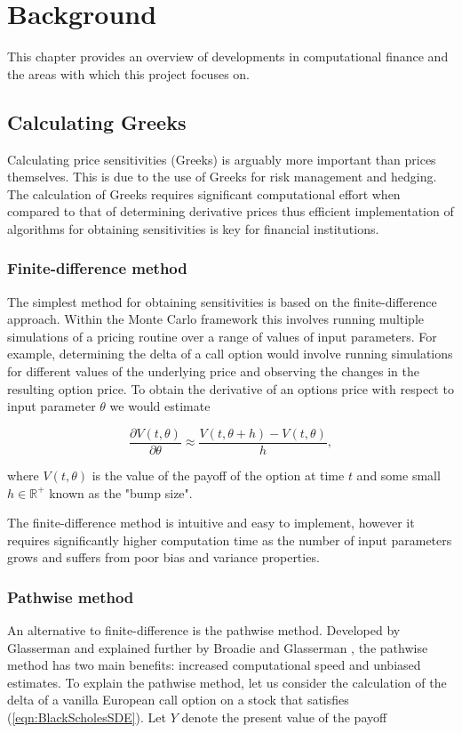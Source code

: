 \chapter{Background} \label{cha:Background}
This chapter provides an overview of developments in computational finance and the areas with which this project focuses on.

\section{Calculating Greeks}
Calculating price sensitivities (Greeks) is arguably more important than prices themselves. This is due to the use of Greeks for risk management and hedging. The calculation of Greeks requires significant computational effort when compared to that of determining derivative prices thus efficient implementation of algorithms for obtaining sensitivities is key for financial institutions.

\subsection{Finite-difference method}
The simplest method for obtaining sensitivities is based on the finite-difference approach. Within the Monte Carlo framework this involves running multiple simulations of a pricing routine over a range of values of input parameters. For example, determining the delta of a call option would involve running simulations for different values of the underlying price and observing the changes in the resulting option price. To obtain the derivative of an options price with respect to input parameter $\theta$ we would estimate 

\begin{equation*}
    \frac{\partial V(t, \theta)}{\partial \theta} \approx \frac{V(t, \theta + h) - V(t, \theta)}{h},
\end{equation*}

where $V(t, \theta)$ is the value of the payoff of the option at time $t$ and some small $h \in \mathbb{R}^+$ known as the "bump size".

The finite-difference method is intuitive and easy to implement, however it requires significantly higher computation time as the number of input parameters grows and suffers from poor bias and variance properties.

\subsection{Pathwise method} \label{sec:PathwiseMethod}
An alternative to finite-difference is the pathwise method. Developed by Glasserman \cite{glasserman1991gradient} and explained further by Broadie and Glasserman \cite{broadie1996estimating}, the pathwise method has two main benefits: increased computational speed and unbiased estimates. To explain the pathwise method, let us consider the calculation of the delta of a vanilla European call option on a stock that satisfies (\ref{eqn:BlackScholesSDE}). Let $Y$ denote the present value of the payoff

